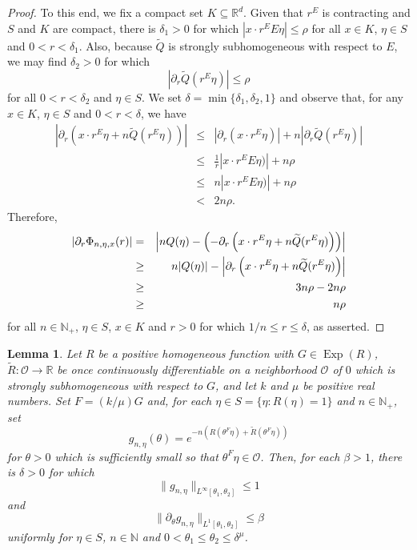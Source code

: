 \documentclass[11pt, letter]{book}
\newtheorem{lemma}[theorem]{Lemma}
\newcommand\Exp{\operatorname{Exp}}
\begin{document}
\begin{proof}
To this end, we fix a compact set $K\subseteq\mathbb{R}^d$. Given that $r^E$ is contracting and $S$ and $K$ are compact, there is $\delta_1>0$ for which $|x\cdot r^E E\eta|\leq \rho$ for all $x\in K$, $\eta\in S$ and $0<r<\delta_1$. Also, because $\widetilde{Q}$ is strongly subhomogeneous with respect to $E$, we may find $\delta_2>0$ for which
\begin{equation*}
    |\partial_r\widetilde{Q}(r^E\eta)|\leq \rho
\end{equation*}
for all $0<r<\delta_2$ and $\eta\in S$. We set $\delta=\min\{\delta_1,\delta_2,1\}$ and observe that, for any $x\in K$, $\eta\in S$ and $0<r<\delta$, we have
\begin{eqnarray*}
\left|\partial_r
\left(x\cdot r^E\eta
+n\widetilde{Q}
(r^E\eta)\right)
\right|
&\leq &
\left|\partial_r\left(x\cdot r^E\eta\right)\right|+n\left|
\partial_r\widetilde{Q}(r^E\eta)
\right|\\
&\leq&\frac{1}{r}|x\cdot r^E E\eta)|+n\rho\\
&\leq& n|x\cdot r^E E\eta)|+n\rho\\
&<&2n\rho.
\end{eqnarray*}
Therefore,
\begin{eqnarray*}
\abs{\partial_r\Phi_{n,\eta,x}(r)}&=&\abs{nQ(\eta)- \left(-\partial_r\left(x\cdot r^E\eta+n\widetilde{Q}(r^E\eta)\right)\right)}\\
&\geq& n|Q(\eta)|-\left|\partial_r
\left(x\cdot r^E\eta
+n\widetilde{Q}
(r^E\eta)\right)
\right|\\
&\geq& 3n\rho-2n\rho\\
&\geq &n\rho
\end{eqnarray*}
for all $n\in\mathbb{N}_+$, $\eta\in S$, $x\in K$ and $r>0$ for which $1/n\leq r\leq \delta$, as asserted.
\end{proof}


\begin{framed}
\begin{lemma}\label{lem:AmplitudeSobolevEstimates}
Let $R$ be a positive homogeneous function with $G\in\Exp(R)$, $\widetilde{R}:\mathcal{O}\to\mathbb{R}$ be once continuously differentiable on a neighborhood $\mathcal{O}$ of $0$ which is strongly subhomogeneous with respect to $G$, and let $k$ and $\mu$ be positive real numbers. Set $F=(k/\mu) G$ and, for each $\eta\in S=\{\eta:R(\eta)=1\}$ and $n\in\mathbb{N}_+$, set
\begin{equation*}
    g_{n,\eta}(\theta)=e^{-n\left(R\left(\theta^F\eta\right)+\widetilde{R}\left(\theta^F\eta\right)\right)}
\end{equation*}
for $\theta>0$ which is sufficiently small so that $\theta^F\eta\in\mathcal{O}$. Then, for each $\beta>1$, there is $\delta>0$ for which 
\begin{equation*}
    \|g_{n,\eta}\|_{L^\infty[\theta_1,\theta_2]}\leq 1
\end{equation*}
and
\begin{equation*}
    \|\partial_\theta g_{n,\eta}\|_{L^1[\theta_1,\theta_2]}\leq \beta
\end{equation*}
uniformly for $\eta\in S$, $n\in\mathbb{N}$ and $0<\theta_1\leq\theta_2\leq \delta^{\mu}$.
\end{lemma}
\end{framed}
\end{document}
